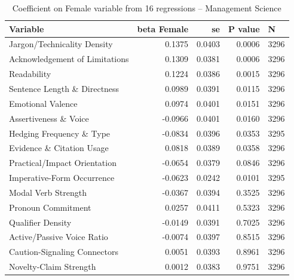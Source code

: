 \begin{table}
\caption{Coefficient on Female variable from 16 regressions -- Management Science}
\label{tab:reg_MS}
\begin{tabular}{lrrrl}
\toprule
Variable & beta Female & se & P value & N \\
\midrule
Jargon/Technicality Density & 0.1375 & 0.0403 & 0.0006 & 3296 \\
Acknowledgement of Limitations & 0.1309 & 0.0381 & 0.0006 & 3296 \\
Readability & 0.1224 & 0.0386 & 0.0015 & 3296 \\
Sentence Length \& Directness & 0.0989 & 0.0391 & 0.0115 & 3296 \\
Emotional Valence & 0.0974 & 0.0401 & 0.0151 & 3296 \\
Assertiveness \& Voice & -0.0966 & 0.0401 & 0.0160 & 3296 \\
Hedging Frequency \& Type & -0.0834 & 0.0396 & 0.0353 & 3295 \\
Evidence \& Citation Usage & 0.0818 & 0.0389 & 0.0358 & 3296 \\
Practical/Impact Orientation & -0.0654 & 0.0379 & 0.0846 & 3296 \\
Imperative-Form Occurrence & -0.0623 & 0.0242 & 0.0101 & 3295 \\
Modal Verb Strength & -0.0367 & 0.0394 & 0.3525 & 3296 \\
Pronoun Commitment & 0.0257 & 0.0411 & 0.5323 & 3296 \\
Qualifier Density & -0.0149 & 0.0391 & 0.7025 & 3296 \\
Active/Passive Voice Ratio & -0.0074 & 0.0397 & 0.8515 & 3296 \\
Caution-Signaling Connectors & 0.0051 & 0.0393 & 0.8961 & 3296 \\
Novelty-Claim Strength & 0.0012 & 0.0383 & 0.9751 & 3296 \\
\bottomrule
\end{tabular}
\end{table}
